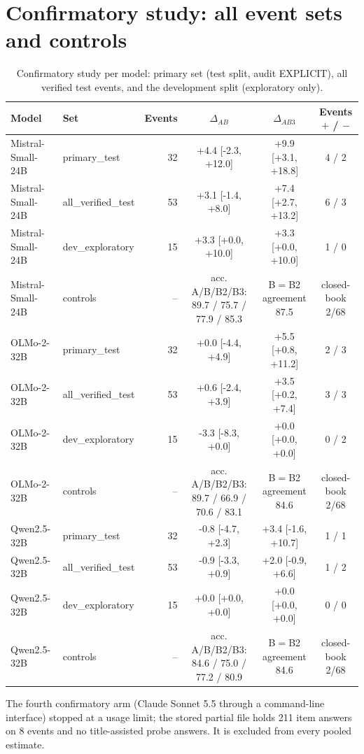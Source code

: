 \documentclass[11pt]{article}
\begin{document}
\section{Confirmatory study: all event sets and controls}
\begin{table}[!ht]
\centering
\scriptsize
\caption{Confirmatory study per model: primary set (test split, audit EXPLICIT), all verified test events, and the development split (exploratory only).}\label{tab:s-confirm}
\begin{tabular}{llrccc}
\toprule
Model & Set & Events & $\Delta_{AB}$ & $\Delta_{AB3}$ & Events $+$ / $-$ \\
\midrule
Mistral-Small-24B & primary\_test & 32 & +4.4 [-2.3, +12.0] & +9.9 [+3.1, +18.8] & 4 / 2 \\
Mistral-Small-24B & all\_verified\_test & 53 & +3.1 [-1.4, +8.0] & +7.4 [+2.7, +13.2] & 6 / 3 \\
Mistral-Small-24B & dev\_exploratory & 15 & +3.3 [+0.0, +10.0] & +3.3 [+0.0, +10.0] & 1 / 0 \\
Mistral-Small-24B & controls & -- & acc. A/B/B2/B3: 89.7 / 75.7 / 77.9 / 85.3 & B$=$B2 agreement 87.5 & closed-book 2/68 \\
OLMo-2-32B & primary\_test & 32 & +0.0 [-4.4, +4.9] & +5.5 [+0.8, +11.2] & 2 / 3 \\
OLMo-2-32B & all\_verified\_test & 53 & +0.6 [-2.4, +3.9] & +3.5 [+0.2, +7.4] & 3 / 3 \\
OLMo-2-32B & dev\_exploratory & 15 & -3.3 [-8.3, +0.0] & +0.0 [+0.0, +0.0] & 0 / 2 \\
OLMo-2-32B & controls & -- & acc. A/B/B2/B3: 89.7 / 66.9 / 70.6 / 83.1 & B$=$B2 agreement 84.6 & closed-book 2/68 \\
Qwen2.5-32B & primary\_test & 32 & -0.8 [-4.7, +2.3] & +3.4 [-1.6, +10.7] & 1 / 1 \\
Qwen2.5-32B & all\_verified\_test & 53 & -0.9 [-3.3, +0.9] & +2.0 [-0.9, +6.6] & 1 / 2 \\
Qwen2.5-32B & dev\_exploratory & 15 & +0.0 [+0.0, +0.0] & +0.0 [+0.0, +0.0] & 0 / 0 \\
Qwen2.5-32B & controls & -- & acc. A/B/B2/B3: 84.6 / 75.0 / 77.2 / 80.9 & B$=$B2 agreement 84.6 & closed-book 2/68 \\
\bottomrule
\end{tabular}
\end{table}

The fourth confirmatory arm (Claude Sonnet 5.5 through a command-line interface) stopped at a usage limit; the stored partial file holds 211 item answers on 8 events and no title-assisted probe answers. It is excluded from every pooled estimate.
\end{document}
